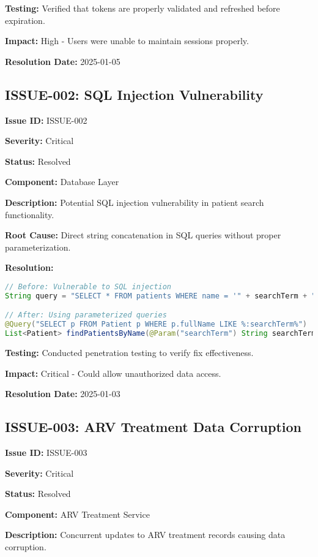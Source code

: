 \documentclass[12pt,a4paper]{article}
\begin{document}
\textbf{Testing:} Verified that tokens are properly validated and refreshed before expiration.

\textbf{Impact:} High - Users were unable to maintain sessions properly.

\textbf{Resolution Date:} 2025-01-05

\subsection{ISSUE-002: SQL Injection Vulnerability}

\textbf{Issue ID:} ISSUE-002

\textbf{Severity:} Critical

\textbf{Status:} Resolved

\textbf{Component:} Database Layer

\textbf{Description:} Potential SQL injection vulnerability in patient search functionality.

\textbf{Root Cause:} Direct string concatenation in SQL queries without proper parameterization.

\textbf{Resolution:}
\begin{lstlisting}[language=Java, caption=SQL Injection Fix]
// Before: Vulnerable to SQL injection
String query = "SELECT * FROM patients WHERE name = '" + searchTerm + "'";

// After: Using parameterized queries
@Query("SELECT p FROM Patient p WHERE p.fullName LIKE %:searchTerm%")
List<Patient> findPatientsByName(@Param("searchTerm") String searchTerm);
\end{lstlisting}

\textbf{Testing:} Conducted penetration testing to verify fix effectiveness.

\textbf{Impact:} Critical - Could allow unauthorized data access.

\textbf{Resolution Date:} 2025-01-03

\subsection{ISSUE-003: ARV Treatment Data Corruption}

\textbf{Issue ID:} ISSUE-003

\textbf{Severity:} Critical

\textbf{Status:} Resolved

\textbf{Component:} ARV Treatment Service

\textbf{Description:} Concurrent updates to ARV treatment records causing data corruption.
\end{document}
